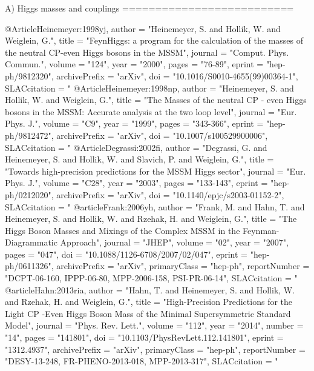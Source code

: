 
A) Higgs masses and couplings
   ==========================

@Article{Heinemeyer:1998yj,
     author    = "Heinemeyer, S. and Hollik, W. and Weiglein, G.",
     title     = "{FeynHiggs: a program for the calculation of the masses of
                  the neutral CP-even Higgs bosons in the MSSM}",
     journal   = "Comput. Phys. Commun.",
     volume    = "124",
     year      = "2000",
     pages     = "76-89",
     eprint    = "hep-ph/9812320",
     archivePrefix = "arXiv",
     doi       = "10.1016/S0010-4655(99)00364-1",
     SLACcitation  = "%
}
@Article{Heinemeyer:1998np,
     author    = "Heinemeyer, S. and Hollik, W. and Weiglein, G.",
     title     = "{The Masses of the neutral CP - even Higgs bosons in the
                  MSSM: Accurate analysis at the two loop level}",
     journal   = "Eur. Phys. J.",
     volume    = "C9",
     year      = "1999",
     pages     = "343-366",
     eprint    = "hep-ph/9812472",
     archivePrefix = "arXiv",
     doi       = "10.1007/s100529900006",
     SLACcitation  = "%
}
@Article{Degrassi:2002fi,
     author    = "Degrassi, G. and Heinemeyer, S. and Hollik, W. and Slavich,
                  P. and Weiglein, G.",
     title     = "{Towards high-precision predictions for the MSSM Higgs
                  sector}",
     journal   = "Eur. Phys. J.",
     volume    = "C28",
     year      = "2003",
     pages     = "133-143",
     eprint    = "hep-ph/0212020",
     archivePrefix = "arXiv",
     doi       = "10.1140/epjc/s2003-01152-2",
     SLACcitation  = "%
}
@article{Frank:2006yh,
      author         = "Frank, M. and Hahn, T. and Heinemeyer, S. and Hollik, W.
                        and Rzehak, H. and Weiglein, G.",
      title          = "{The Higgs Boson Masses and Mixings of the Complex MSSM
                        in the Feynman-Diagrammatic Approach}",
      journal        = "JHEP",
      volume         = "02",
      year           = "2007",
      pages          = "047",
      doi            = "10.1088/1126-6708/2007/02/047",
      eprint         = "hep-ph/0611326",
      archivePrefix  = "arXiv",
      primaryClass   = "hep-ph",
      reportNumber   = "DCPT-06-160, IPPP-06-80, MPP-2006-158, PSI-PR-06-14",
      SLACcitation   = "%
}
@article{Hahn:2013ria,
      author         = "Hahn, T. and Heinemeyer, S. and Hollik, W. and Rzehak, H.
                        and Weiglein, G.",
      title          = "{High-Precision Predictions for the Light CP -Even Higgs
                        Boson Mass of the Minimal Supersymmetric Standard Model}",
      journal        = "Phys. Rev. Lett.",
      volume         = "112",
      year           = "2014",
      number         = "14",
      pages          = "141801",
      doi            = "10.1103/PhysRevLett.112.141801",
      eprint         = "1312.4937",
      archivePrefix  = "arXiv",
      primaryClass   = "hep-ph",
      reportNumber   = "DESY-13-248, FR-PHENO-2013-018, MPP-2013-317",
      SLACcitation   = "%
}
